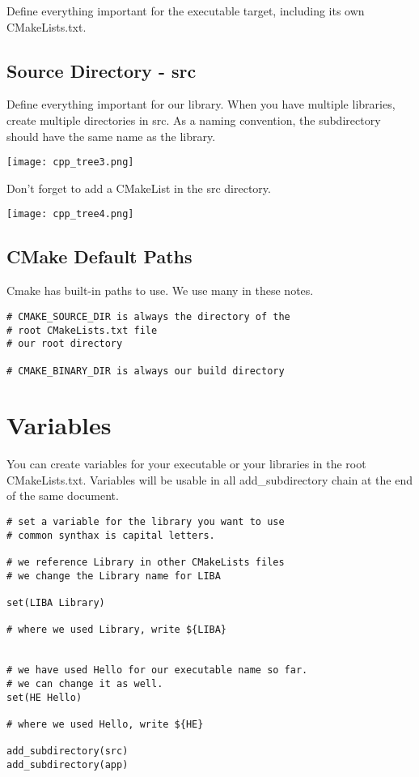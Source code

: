 \documentclass[openany]{report}
\begin{document}
Define everything important for the executable target, including its own CMakeLists.txt.

\subsection{Source Directory - src}

Define everything important for our library. When you have multiple libraries, create multiple directories in
src. As a naming convention, the subdirectory should have the same name as the library.

\begin{center}
    \texttt{[image: cpp\_tree3.png]}
\end{center}

Don't forget to add a CMakeList in the src directory.


\begin{center}
    \texttt{[image: cpp\_tree4.png]}
\end{center}

\subsection{CMake Default Paths}

Cmake has built-in paths to use. We use many in these notes.

\begin{verbatim}
# CMAKE_SOURCE_DIR is always the directory of the
# root CMakeLists.txt file
# our root directory

# CMAKE_BINARY_DIR is always our build directory
\end{verbatim}

\section{Variables}

You can create variables for your executable or your libraries in the root CMakeLists.txt. Variables
will be usable in all add\_subdirectory chain at the end of the same document.

\begin{verbatim}
# set a variable for the library you want to use
# common synthax is capital letters.

# we reference Library in other CMakeLists files
# we change the Library name for LIBA

set(LIBA Library)

# where we used Library, write ${LIBA}


# we have used Hello for our executable name so far.
# we can change it as well.
set(HE Hello)

# where we used Hello, write ${HE}

add_subdirectory(src)
add_subdirectory(app)
\end{verbatim}
\end{document}
